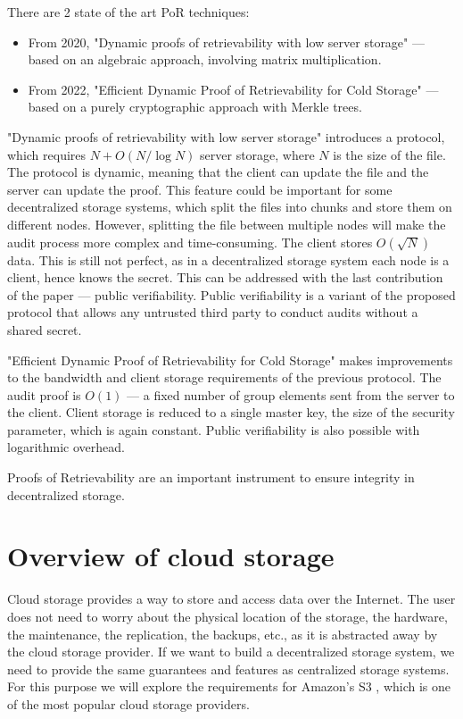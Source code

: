 There are 2 state of the art PoR techniques:
\begin{itemize}
    \item From 2020, "Dynamic proofs of retrievability with low server storage" \cite{poralgebra} —
        based on an algebraic approach, involving matrix multiplication.
    \item From 2022, "Efficient Dynamic Proof of Retrievability for Cold Storage" \cite{pormerkle} —
        based on a purely cryptographic approach with Merkle trees.
\end{itemize}

"Dynamic proofs of retrievability with low server storage" introduces a protocol, which 
requires $N + O(N/\log N)$ server storage, where $N$ is the size of the file.
The protocol is dynamic, meaning that the client can update the file and the server can update the proof.
This feature could be important for some decentralized storage systems, which split the files into chunks and
store them on different nodes.
However, splitting the file between multiple nodes will make the audit process more complex and time-consuming.
The client stores $O(\sqrt{N})$ data.
This is still not perfect, as in a decentralized storage system each node is a client, hence knows the secret.
This can be addressed with the last contribution of the paper --- public verifiability.
Public verifiability is a variant of the proposed protocol that allows any untrusted third party
to conduct audits without a shared secret.

"Efficient Dynamic Proof of Retrievability for Cold Storage" makes improvements to the bandwidth and
client storage requirements of the previous protocol.
The audit proof is $O(1)$ --- a fixed number of group elements sent from the server to the client.
Client storage is reduced to a single master key, the size of the security parameter,
which is again constant.
Public verifiability is also possible with logarithmic overhead.

Proofs of Retrievability are an important instrument to ensure integrity in decentralized storage.

\label{section:cloud}
\section{Overview of cloud storage}

Cloud storage provides a way to store and access data over the Internet.
The user does not need to worry about the physical location of the storage, the hardware, the maintenance,
the replication, the backups, etc., as it is abstracted away by the cloud storage provider.
If we want to build a decentralized storage system, we need to provide the same guarantees and features
as centralized storage systems.
For this purpose we will explore the requirements for Amazon's S3 \cite{s3-faq},
which is one of the most popular cloud storage providers.

